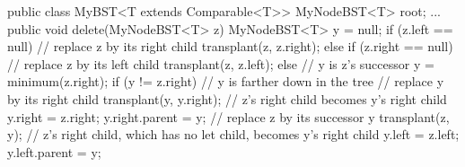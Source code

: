 public class MyBST<T extends Comparable<T>> {
	MyNodeBST<T> root;
	...
	public void delete(MyNodeBST<T> z) {
		MyNodeBST<T> y = null;
		if (z.left == null) {
			// replace z by its right child
			transplant(z, z.right);
		} else if (z.right == null) {
			// replace z by its left child
			transplant(z, z.left);
		} else {
			// y is z's successor
			y = minimum(z.right);
			if (y != z.right) {
				// y is farther down in the tree
				// replace y by its right child
				transplant(y, y.right);
				// z's right child becomes y's right child
				y.right = z.right;
				y.right.parent = y;
			}
			// replace z by its successor y
			transplant(z, y);
			// z's right child, which has no let child, becomes y's right child
			y.left = z.left;
			y.left.parent = y;
		}
	}
}